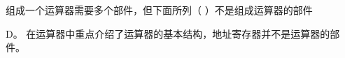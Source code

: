 \question 组成一个运算器需要多个部件，但下面所列（ ）不是组成运算器的部件
\par{}
\begin{solution}D。 在运算器中重点介绍了运算器的基本结构，地址寄存器并不是运算器的部件。
\end{solution}
